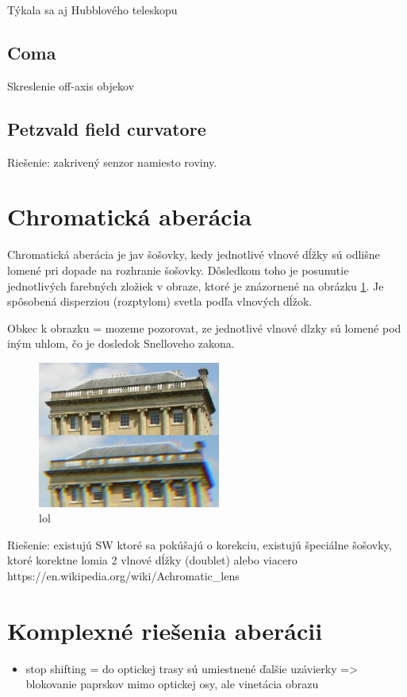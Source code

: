 Týkala sa aj Hubblového teleskopu
\subsection{Coma}
Skreslenie off-axis objekov
\subsection{Petzvald field curvatore}
Riešenie: zakrivený senzor namiesto roviny.

\section{Chromatická aberácia}
Chromatická aberácia je jav šošovky, kedy jednotlivé vlnové dĺžky sú odlišne lomené pri dopade na
rozhranie šošovky. Dôsledkom toho je posunutie jednotlivých farebných zložiek v obraze, ktoré je
znázornené na obrázku \ref{chromaticAexample}.
Je spôsobená disperziou (rozptylom) svetla podľa vlnových dĺžok.

Obkec k obrazku = mozeme pozorovat, ze jednotlivé vlnové dlzky sú lomené pod iným uhlom, čo je
dosledok Snelloveho zakona.
\begin{figure}[h]
\centering
\label{chromaticAexample}
\includegraphics[width=6cm]{obrazky-figures/chromaticAberrationWikipedia.jpg}
\caption{lol}
\end{figure}

Riešenie: existujú SW \cite{automaticRemovalCA} ktoré sa pokúšajú o korekciu, 
existujú špeciálne šošovky, ktoré korektne lomia 2 vlnové dĺžky (doublet) alebo viacero
https://en.wikipedia.org/wiki/Achromatic\_lens

\section{Komplexné riešenia aberácii}
\begin{itemize}
    \item stop shifting = do optickej trasy sú umiestnené ďalšie uzávierky => blokovanie paprskov
        mimo optickej osy, ale vinetácia obrazu \cite{josesasian}
\end{itemize}
